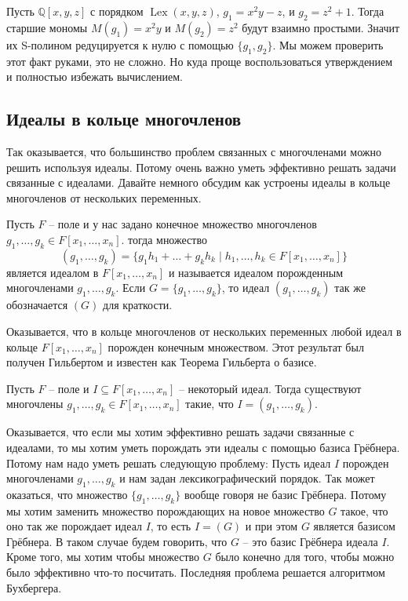 \begin{example}
Пусть $\mathbb Q[x, y, z]$ с порядком $\operatorname{Lex}(x, y, z)$, $g_1 = x^2 y - z$, и $g_2 = z^2 + 1$.
Тогда старшие мономы $M(g_1) = x^2 y$ и $M(g_2) = z^2$ будут взаимно простыми.
Значит их S-полином редуцируется к нулю с помощью $\{g_1,g_2\}$.
Мы можем проверить этот факт руками, это не сложно.
Но куда проще воспользоваться утверждением и полностью избежать вычислением.
\end{example}


\subsection{Идеалы в кольце многочленов}

Так оказывается, что большинство проблем связанных с многочленами можно решить используя идеалы.
Потому очень важно уметь эффективно решать задачи связанные с идеалами.
Давайте немного обсудим как устроены идеалы в кольце многочленов от нескольких переменных.

\begin{definition}
Пусть $F$ -- поле и у нас задано конечное множество многочленов $g_1,\ldots,g_k\in F[x_1,\ldots,x_n]$.
тогда множество
\[
(g_1,\ldots,g_k) = \{g_1 h_1 + \ldots + g_k h_k\mid h_1,\ldots,h_k\in F[x_1,\ldots,x_n]\}
\]
является идеалом в $F[x_1,\ldots,x_n]$ и называется идеалом порожденным многочленами $g_1,\ldots,g_k$.
Если $G = \{g_1,\ldots,g_k\}$, то идеал $(g_1,\ldots,g_k)$ так же обозначается $(G)$ для краткости.
\end{definition}

Оказывается, что в кольце многочленов от нескольких переменных любой идеал в кольце $F[x_1,\ldots,x_n]$ порожден конечным множеством.
Этот результат был получен Гильбертом и известен как Теорема Гильберта о базисе.

\begin{claim}
Пусть $F$ -- поле и $I\subseteq F[x_1,\ldots,x_n]$ -- некоторый идеал.
Тогда существуют многочлены $g_1,\ldots,g_k\in F[x_1,\ldots,x_n]$ такие, что $I = (g_1,\ldots,g_k)$.
\end{claim}

Оказывается, что если мы хотим эффективно решать задачи связанные с идеалами, то мы хотим уметь порождать эти идеалы с помощью базиса Грёбнера.
Потому нам надо уметь решать следующую проблему:
Пусть идеал $I$ порожден многочленами $g_1,\ldots,g_k$ и нам задан лексикографический порядок.
Так может оказаться, что множество $\{g_1,\ldots,g_k\}$ вообще говоря не базис Грёбнера.
Потому мы хотим заменить множество порождающих на новое множество $G$ такое, что оно так же порождает идеал $I$, то есть $I = (G)$ и при этом $G$ является базисом Грёбнера.
В таком случае будем говорить, что $G$ -- это базис Грёбнера идеала $I$.
Кроме того, мы хотим чтобы множество $G$ было конечно для того, чтобы можно было эффективно что-то посчитать.
Последняя проблема решается алгоритмом Бухбергера.

